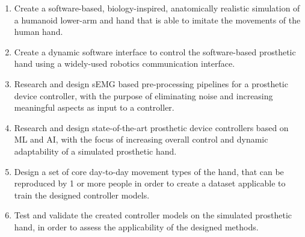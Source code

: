 \documentclass[../main.tex]{subfiles}
\begin{document}
\begin{enumerate}
\item Create a software-based, biology-inspired, anatomically realistic simulation of a humanoid lower-arm and hand that is able to imitate the movements of the human hand.
\item Create a dynamic software interface to control the software-based prosthetic hand using a widely-used robotics communication interface.
\item Research and design \gls{sEMG} based pre-processing pipelines for a prosthetic device controller, with the purpose of eliminating noise and increasing meaningful aspects as input to a controller. 
\item Research and design state-of-the-art prosthetic device controllers based on \gls{ML} and \gls{AI}, with the focus of increasing overall control and dynamic adaptability of a simulated prosthetic hand.
\item Design a set of core day-to-day movement types of the hand, that can be reproduced by 1 or more people in order to create a dataset applicable to train the designed controller models.
\item Test and validate the created controller models on the simulated prosthetic hand, in order to assess the applicability of the designed methods.
\end{enumerate}
\end{document}
